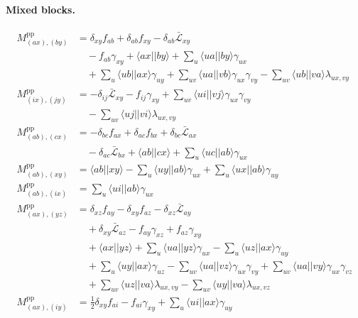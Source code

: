 \documentclass[aip,jcp,reprint,noshowkeys,superscriptaddress]{revtex4-1}
\newcommand{\pp}{\text{pp}}
\begin{document}
\paragraph*{Mixed blocks.}
\begin{align}
  M^{\pp}_{(ax),(by)} &= \delta_{xy}f_{ab} +\delta_{ab}f_{xy} -\delta_{ab}\bar{\mathcal L}_{xy} \nonumber\\
  &\quad -f_{ab}\gamma_{xy} +\langle ax||by\rangle +\sum_{u}\langle ua||by\rangle\gamma_{ux} \nonumber\\
  &\quad +\sum_{u}\langle ub||ax\rangle\gamma_{uy} +\sum_{uv}\langle ua||vb\rangle\gamma_{ux}\gamma_{vy} -\sum_{uv}\langle ub||va\rangle\lambda_{ux,vy}
  \label{eq:pp-av-av}\\
  M^{\pp}_{(ix),(jy)} &= -\delta_{ij}\bar{\mathcal L}_{xy} -f_{ij}\gamma_{xy} +\sum_{uv}\langle ui||vj\rangle\gamma_{ux}\gamma_{vy} \nonumber\\
  &\quad -\sum_{uv}\langle uj||vi\rangle\lambda_{ux,vy}
  \label{eq:pp-ca-ca}\\
  M^{\pp}_{(ab),(cx)} &= -\delta_{bc}f_{ax} +\delta_{ac}f_{bx} +\delta_{bc}\bar{\mathcal L}_{ax} \nonumber\\
  &\quad -\delta_{ac}\bar{\mathcal L}_{bx} +\langle ab||cx\rangle +\sum_{u}\langle uc||ab\rangle\gamma_{ux}
  \label{eq:pp-vv-av}\\
  M^{\pp}_{(ab),(xy)} &= \langle ab||xy\rangle -\sum_{u}\langle uy||ab\rangle\gamma_{ux} +\sum_{u}\langle ux||ab\rangle\gamma_{uy}
  \label{eq:pp-vv-aa}\\
  M^{\pp}_{(ab),(ix)} &= \sum_{u}\langle ui||ab\rangle\gamma_{ux}
  \label{eq:pp-vv-ca}\\
  M^{\pp}_{(ax),(yz)} &= \delta_{xz}f_{ay} -\delta_{xy}f_{az} -\delta_{xz}\bar{\mathcal L}_{ay} \nonumber\\
  &\quad +\delta_{xy}\bar{\mathcal L}_{az} -f_{ay}\gamma_{xz} +f_{az}\gamma_{xy} \nonumber\\
  &\quad +\langle ax||yz\rangle +\sum_{u}\langle ua||yz\rangle\gamma_{ux} -\sum_{u}\langle uz||ax\rangle\gamma_{uy} \nonumber\\
  &\quad +\sum_{u}\langle uy||ax\rangle\gamma_{uz} -\sum_{uv}\langle ua||vz\rangle\gamma_{ux}\gamma_{vy} +\sum_{uv}\langle ua||vy\rangle\gamma_{ux}\gamma_{vz} \nonumber\\
  &\quad +\sum_{uv}\langle uz||va\rangle\lambda_{ux,vy} -\sum_{uv}\langle uy||va\rangle\lambda_{ux,vz}
  \label{eq:pp-av-aa}\\
  M^{\pp}_{(ax),(iy)} &= \tfrac{1}{2}\delta_{xy}f_{ai} -f_{ai}\gamma_{xy} +\sum_{u}\langle ui||ax\rangle\gamma_{uy} \nonumber\\

\end{align}
\end{document}
